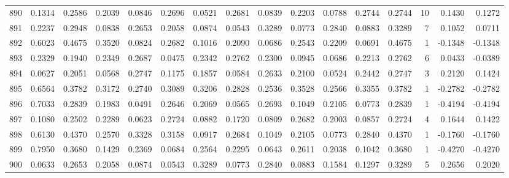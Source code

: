 \begin{tabular}{lrrrrrrrrrrrrrrr}
890 &      0.1314 &  0.2586 &  0.2039 &  0.0846 &  0.2696 &  0.0521 &  0.2681 &  0.0839 &  0.2203 &  0.0788 &   0.2744 &     0.2744 &     10 &                    0.1430 &                     0.1272 \\
891 &      0.2237 &  0.2948 &  0.0838 &  0.2653 &  0.2058 &  0.0874 &  0.0543 &  0.3289 &  0.0773 &  0.2840 &   0.0883 &     0.3289 &      7 &                    0.1052 &                     0.0711 \\
892 &      0.6023 &  0.4675 &  0.3520 &  0.0824 &  0.2682 &  0.1016 &  0.2090 &  0.0686 &  0.2543 &  0.2209 &   0.0691 &     0.4675 &      1 &                   -0.1348 &                    -0.1348 \\
893 &      0.2329 &  0.1940 &  0.2349 &  0.2687 &  0.0475 &  0.2342 &  0.2762 &  0.2300 &  0.0945 &  0.0686 &   0.2213 &     0.2762 &      6 &                    0.0433 &                    -0.0389 \\
894 &      0.0627 &  0.2051 &  0.0568 &  0.2747 &  0.1175 &  0.1857 &  0.0584 &  0.2633 &  0.2100 &  0.0524 &   0.2442 &     0.2747 &      3 &                    0.2120 &                     0.1424 \\
895 &      0.6564 &  0.3782 &  0.3172 &  0.2740 &  0.3089 &  0.3206 &  0.2828 &  0.2536 &  0.3528 &  0.2566 &   0.3355 &     0.3782 &      1 &                   -0.2782 &                    -0.2782 \\
896 &      0.7033 &  0.2839 &  0.1983 &  0.0491 &  0.2646 &  0.2069 &  0.0565 &  0.2693 &  0.1049 &  0.2105 &   0.0773 &     0.2839 &      1 &                   -0.4194 &                    -0.4194 \\
897 &      0.1080 &  0.2502 &  0.2289 &  0.0623 &  0.2724 &  0.0882 &  0.1720 &  0.0809 &  0.2682 &  0.2003 &   0.0857 &     0.2724 &      4 &                    0.1644 &                     0.1422 \\
898 &      0.6130 &  0.4370 &  0.2570 &  0.3328 &  0.3158 &  0.0917 &  0.2684 &  0.1049 &  0.2105 &  0.0773 &   0.2840 &     0.4370 &      1 &                   -0.1760 &                    -0.1760 \\
899 &      0.7950 &  0.3680 &  0.1429 &  0.2369 &  0.0684 &  0.2564 &  0.2295 &  0.0643 &  0.2611 &  0.2038 &   0.1042 &     0.3680 &      1 &                   -0.4270 &                    -0.4270 \\
900 &      0.0633 &  0.2653 &  0.2058 &  0.0874 &  0.0543 &  0.3289 &  0.0773 &  0.2840 &  0.0883 &  0.1584 &   0.1297 &     0.3289 &      5 &                    0.2656 &                     0.2020 \\

\end{tabular}

